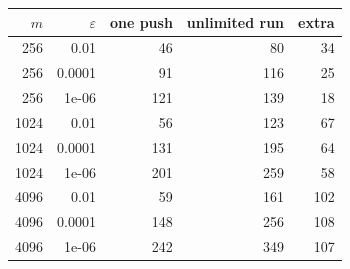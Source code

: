 \begin{tabular}{@{}rrrrr@{}}
\toprule
$m$ & $\varepsilon$ & one push & unlimited run & extra \\
\midrule
256 & 0.01 & 46 & 80 & 34 \\
256 & 0.0001 & 91 & 116 & 25 \\
256 & 1e-06 & 121 & 139 & 18 \\
1024 & 0.01 & 56 & 123 & 67 \\
1024 & 0.0001 & 131 & 195 & 64 \\
1024 & 1e-06 & 201 & 259 & 58 \\
4096 & 0.01 & 59 & 161 & 102 \\
4096 & 0.0001 & 148 & 256 & 108 \\
4096 & 1e-06 & 242 & 349 & 107 \\
\bottomrule
\end{tabular}
